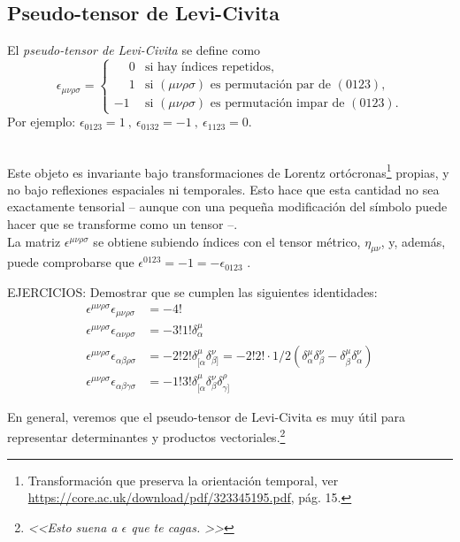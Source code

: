 \subsection{Pseudo-tensor de Levi-Civita}
\begin{define}
    El \emph{pseudo-tensor de Levi-Civita} se define como 
    $$
    \epsilon_{\mu \nu \rho \sigma} = \begin{cases}
        \phantom{-}0 &\text{si hay índices repetidos,}\\
        \phantom{-}1 &\text{si }(\mu \nu \rho \sigma) \text{ es permutación par de }(0123) , \\
        -1 &\text{si }(\mu \nu \rho \sigma) \text{ es permutación impar de }(0123).
    \end{cases}
    $$
    Por ejemplo: $\epsilon_{0123} = 1\ , \ \epsilon_{0132} = -1\ , \ \epsilon_{1123} = 0$.
\end{define}\\
Este objeto es invariante bajo transformaciones de Lorentz ortócronas\footnote{Transformación que preserva la orientación temporal, ver \url{https://core.ac.uk/download/pdf/323345195.pdf}, pág. 15.} propias, y no bajo reflexiones espaciales ni temporales. Esto hace que esta cantidad no sea exactamente tensorial -- aunque con una pequeña modificación del símbolo puede hacer que se transforme como un tensor --. \\

La matriz $\epsilon^{\mu \nu \rho \sigma}$ se obtiene subiendo índices con el tensor métrico, $\eta_{\mu \nu}$, y, además, puede comprobarse que $\epsilon^{0123} = -1 = -\epsilon_{0123}$ .
\begin{mybox}
    EJERCICIOS: Demostrar que se cumplen las siguientes identidades:
    \begin{align}
        \epsilon^{\mu \nu \rho \sigma}\epsilon_{\mu \nu \rho \sigma} &= -4!\\
        \epsilon^{\mu \nu \rho \sigma}\epsilon_{\alpha \nu \rho \sigma} &= -3! 1! \delta^\mu _\alpha \\
        \epsilon^{\mu \nu \rho \sigma}\epsilon_{\alpha \beta \rho \sigma} &= -2! 2! \delta ^\mu_{[ \alpha } \delta^\nu _{\beta ]} =-2!2!\cdot  1/2(\delta^\mu _\alpha \delta^\nu _\beta - \delta^\mu_\beta \delta ^\nu _\alpha )\\
        \epsilon^{\mu \nu \rho \sigma}\epsilon_{\alpha \beta \gamma \sigma} &= -1! 3! \delta^\mu _{[\alpha }\delta ^\nu _{\beta} \delta^\rho _{\gamma]}
    \end{align}
\end{mybox}
En general, veremos que el pseudo-tensor de Levi-Civita es muy útil para representar determinantes y productos vectoriales.\footnote{\emph{<<Esto suena a $\epsilon$ que te cagas. >>}}\\


